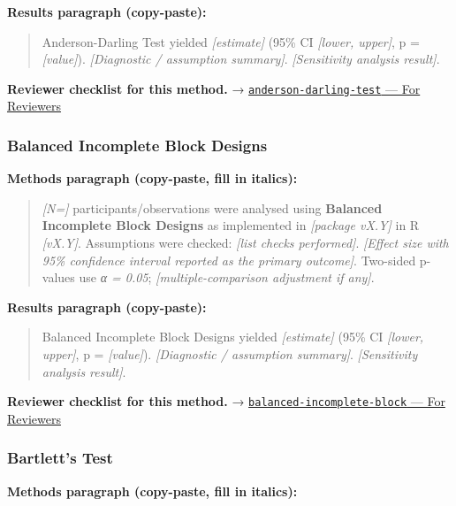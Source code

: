 \documentclass[
]{article}
\begin{document}
\textbf{Results paragraph (copy-paste):}

\begin{quote}
Anderson-Darling Test yielded \emph{{[}estimate{]}} (95\% CI
\emph{{[}lower, upper{]}}, p = \emph{{[}value{]}}). \emph{{[}Diagnostic
/ assumption summary{]}}. \emph{{[}Sensitivity analysis result{]}}.
\end{quote}

\textbf{Reviewer checklist for this method.} →
\href{../chapters/04-inferential/anderson-darling-test.Rmd\#for-reviewers}{\texttt{anderson-darling-test}
--- For Reviewers}

\subsubsection{Balanced Incomplete Block
Designs}\label{balanced-incomplete-block-designs}

\textbf{Methods paragraph (copy-paste, fill in italics):}

\begin{quote}
\emph{{[}N={]}} participants/observations were analysed using
\textbf{Balanced Incomplete Block Designs} as implemented in
\emph{{[}package vX.Y{]}} in R \emph{{[}vX.Y{]}}. Assumptions were
checked: \emph{{[}list checks performed{]}}. \emph{{[}Effect size with
95\% confidence interval reported as the primary outcome{]}}. Two-sided
p-values use \emph{α = 0.05}; \emph{{[}multiple-comparison adjustment if
any{]}}.
\end{quote}

\textbf{Results paragraph (copy-paste):}

\begin{quote}
Balanced Incomplete Block Designs yielded \emph{{[}estimate{]}} (95\% CI
\emph{{[}lower, upper{]}}, p = \emph{{[}value{]}}). \emph{{[}Diagnostic
/ assumption summary{]}}. \emph{{[}Sensitivity analysis result{]}}.
\end{quote}

\textbf{Reviewer checklist for this method.} →
\href{../chapters/16-design/balanced-incomplete-block.Rmd\#for-reviewers}{\texttt{balanced-incomplete-block}
--- For Reviewers}

\subsubsection{Bartlett's Test}\label{bartletts-test}

\textbf{Methods paragraph (copy-paste, fill in italics):}
\end{document}
